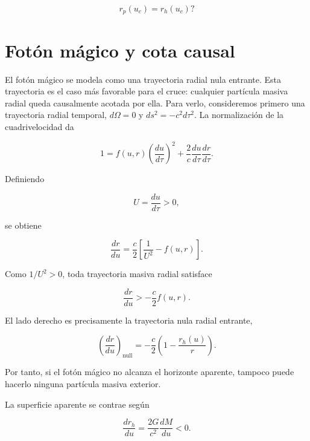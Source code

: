 \documentclass[
aps,
prd,
reprint,
superscriptaddress,
nofootinbib,
amsmath,
amssymb
]{revtex4-2}
\begin{document}
\begin{equation}
r_p(u_c)=r_h(u_c)?
\label{eqCrossingCondition}
\end{equation}

\section{Fotón mágico y cota causal}

El fotón mágico se modela como una trayectoria radial nula entrante. Esta trayectoria es el caso más favorable para el cruce: cualquier partícula masiva radial queda causalmente acotada por ella. Para verlo, consideremos primero una trayectoria radial temporal, $d\Omega=0$ y $ds^2=-c^2d\tau^2$. La normalización de la cuadrivelocidad da

\begin{equation}
1=
f(u,r)
\left(
\frac{du}{d\tau}
\right)^2
+
\frac{2}{c}
\frac{du}{d\tau}
\frac{dr}{d\tau}.
\label{eqVaidyaNormalization}
\end{equation}

Definiendo

\begin{equation}
U=
\frac{du}{d\tau}>0,
\end{equation}

se obtiene

\begin{equation}
\frac{dr}{du}
=
\frac{c}{2}
\left[
\frac{1}{U^2}
-
f(u,r)
\right].
\label{eqTimelikeRadialVaidya}
\end{equation}

Como $1/U^2>0$, toda trayectoria masiva radial satisface

\begin{equation}
\frac{dr}{du}
>
-
\frac{c}{2}
f(u,r).
\label{eqTimelikeBound}
\end{equation}

El lado derecho es precisamente la trayectoria nula radial entrante,

\begin{equation}
\left(
\frac{dr}{du}
\right)_{\mathrm{null}}
=
-
\frac{c}{2}
\left(
1-\frac{r_h(u)}{r}
\right).
\label{eqIngoingNull}
\end{equation}

Por tanto, si el fotón mágico no alcanza el horizonte aparente, tampoco puede hacerlo ninguna partícula masiva exterior.

La superficie aparente se contrae según

\begin{equation}
\frac{dr_h}{du}
=
\frac{2G}{c^2}
\frac{dM}{du}
<0.
\label{eqHorizonRetreat}
\end{equation}
\end{document}
